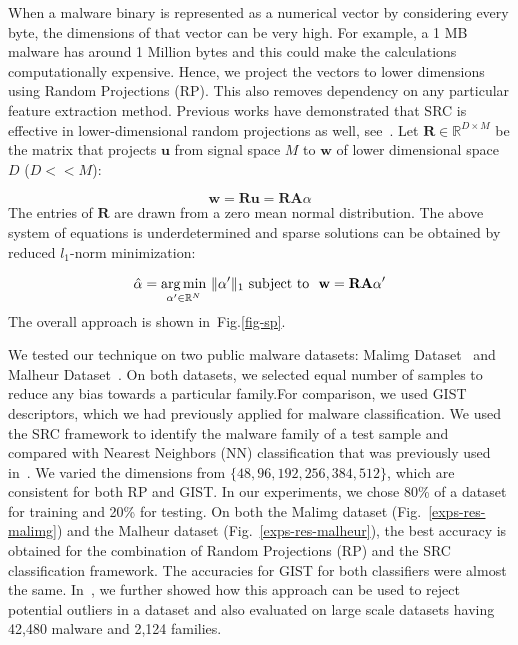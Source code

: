 \documentclass[journal]{IEEEtran}
\DeclareMathOperator*{\argmin}{arg\,min}
\DeclarePairedDelimiter{\norm}{\lVert}{\rVert}
\begin{document}
When a malware binary is represented as a numerical vector by considering every byte, the dimensions of that vector can be very high.
For example, a 1 MB malware has around 1 Million bytes and this could make the calculations computationally expensive.
Hence, we project the vectors to lower dimensions using Random Projections (RP). 
This also removes dependency on any particular feature extraction method.
Previous works have demonstrated that SRC is effective in lower-dimensional random projections as well, see~\cite{2009-donoho-counting,2009-pami-wright-face, 2011-jay-pami}.
Let $\mathbf{R} \in {\mathbb{R}}^{D \times M}$ be the matrix that projects $\mathbf{u}$ from signal space $M$ to $\mathbf{w}$ of lower dimensional space $D$ ($D<<M$):

\begin{equation}
\mathbf{w} = \mathbf{R}\mathbf{u} = \mathbf{R}\mathbf{A}\alpha
\end{equation} 
The entries of $\mathbf{R}$ are drawn from a zero mean normal distribution.
The above system of equations is underdetermined and sparse solutions can be obtained by reduced $l_1$-norm minimization:

\begin{equation}
\hat{\alpha} = \argmin_{\alpha' \in \mathbb{R}^N} \ \norm{\alpha'}_1 \ \text{subject to} \ \ \mathbf{w} = \mathbf{R}\mathbf{A}\alpha' 
\label{src-rp}
\end{equation}
The overall approach is shown in~Fig.\ref{fig-sp}.



We tested our technique on two public malware datasets: Malimg Dataset~\cite{malimg-ds} and Malheur Dataset~\cite{malheur}.
On both datasets, we selected equal number of samples to reduce any bias towards a particular family.For comparison, we used GIST descriptors, which we had previously applied for malware classification.
We used the SRC framework to identify the malware family of a test sample and compared with Nearest Neighbors (NN) classification that was previously used in~\cite{malw-imgs}.
We varied the dimensions from $\{48,96,192,256,384,512\}$, which are consistent for both RP and GIST.
In our experiments, we chose 80\% of a dataset for training and 20\% for testing. 
On both the Malimg dataset (Fig.~\ref{exps-res-malimg}) and the Malheur dataset (Fig.~\ref{exps-res-malheur}), the best accuracy is obtained for the combination of Random Projections (RP) and the SRC classification framework.
The accuracies for GIST for both classifiers were almost the same.
In~\cite{sattva}, we further showed how this approach can be used to reject potential outliers in a dataset and also evaluated on large scale datasets having 42,480 malware and 2,124 families.
\end{document}
